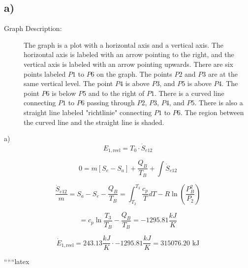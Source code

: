 

\subsection*{a)}

\begin{description}
    \item[Graph Description:] The graph is a plot with a horizontal axis and a vertical axis. The horizontal axis is labeled with an arrow pointing to the right, and the vertical axis is labeled with an arrow pointing upwards. There are six points labeled \( P1 \) to \( P6 \) on the graph. The points \( P2 \) and \( P3 \) are at the same vertical level. The point \( P4 \) is above \( P3 \), and \( P5 \) is above \( P4 \). The point \( P6 \) is below \( P5 \) and to the right of \( P1 \). There is a curved line connecting \( P1 \) to \( P6 \) passing through \( P2 \), \( P3 \), \( P4 \), and \( P5 \). There is also a straight line labeled "richtlinie" connecting \( P1 \) to \( P6 \). The region between the curved line and the straight line is shaded.
\end{description}

a) 
\[
E_{1, \text{reel}} = T_0 \cdot \dot{S}_{e12}
\]

\[
0 = m \left[ S_e - S_a \right] + \frac{Q_B}{T_B} + \int \dot{S}_{e12}
\]

\[
\frac{\dot{S}_{e12}}{m} = S_a - S_e - \frac{Q_B}{T_B} = \int_{T_2}^{T_3} \frac{c_p}{T} dT - R \ln \left( \frac{P_B^2}{P_2} \right)
\]

\[
= c_p \ln \frac{T_3}{T_B} - \frac{Q_B}{T_B} = -1295.81 \frac{kJ}{K}
\]

\[
\dot{E}_{1, \text{reel}} = 243.13 \frac{kJ}{K} \cdot -1295.81 \frac{kJ}{K} = 315076.20 \text{ kJ}
\]

``````latex
